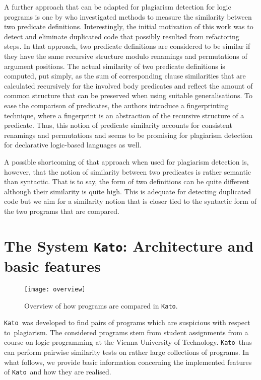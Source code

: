 \documentclass{tlp}
\newcommand{\wrt}[0]{with respect to}
\newcommand{\kato}[0]{\texttt{Kato}\xspace}
\begin{document}
A further approach that can be adapted for plagiarism detection for logic programs is one by  who investigated methods to measure the similarity between two predicate definitions.
Interestingly, the initial motivation of this work was to detect and eliminate duplicated code that possibly resulted from refactoring steps.
In that approach, two predicate definitions are considered to be similar if they have the same recursive structure modulo renamings and 
permutations of argument positions. 
The actual  similarity  of two predicate definitions is computed, put simply,  as the sum of corresponding clause similarities that are calculated  
recursively  for the involved body predicates and reflect the amount
of common structure that can be preserved when using suitable  generalisations.
To ease the comparison of predicates, the authors introduce a fingerprinting technique, where a fingerprint is an abstraction of the recursive 
structure of a predicate. 
Thus,  this  notion of predicate similarity accounts for consistent 
renamings and permutations and
seems to be promising  for plagiarism detection for declarative logic-based languages as well.

A possible shortcoming of that approach when used for plagiarism detection is, however, that the notion of similarity between two predicates is rather semantic than syntactic.
That is to say, the form of two definitions can be quite different although their similarity is quite high. 
This is adequate for detecting duplicated code but we aim for a similarity notion that is closer tied to
the  syntactic form of the two programs that are compared.   


\section{The System \kato: Architecture and basic features}\label{sec:impl}



\begin{figure}[t]
\begin{center}
\texttt{[image: overview]}
\end{center}
\caption{Overview of how programs are  compared in \kato.}
\label{fig:kato}
\end{figure}


\kato\ was developed to find pairs of programs which are suspicious \wrt\ plagiarism. The considered programs stem
from student assignments from a course on logic programming at the Vienna University of Technology. \kato\ thus  can perform pairwise similarity tests on  rather large collections of 
 programs. 
 In what follows, we provide basic information
concerning the implemented features of \kato\ and how they are realised. 
\end{document}
